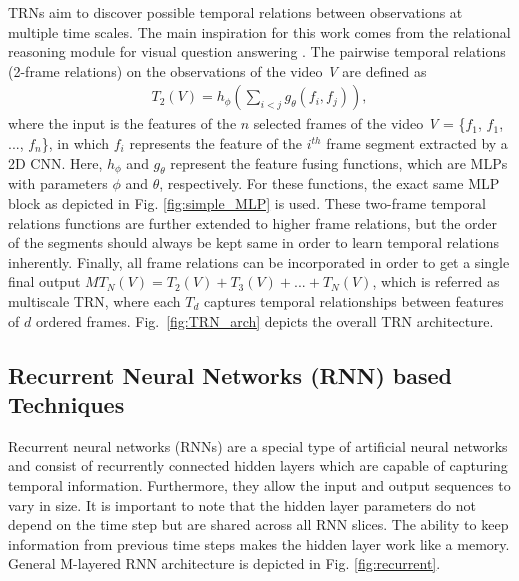 \documentclass[runningheads]{llncs}
\begin{document}
TRNs \cite{Zhou2018-ah} aim to discover possible temporal relations between observations at multiple time scales. The main inspiration for this work comes from the relational reasoning module for visual question answering \cite{santoro2017simple}. The pairwise temporal relations (2-frame relations) on the observations of the video \textit{V} are defined as
\begin{align*}
    T_2(V) = h_{\phi} \left( \sum_{i<j}{g_{\theta}(f_i, f_j)} \right),
\end{align*}
\noindent where the input is the features of the $n$ selected frames of the video \textit{V} = \{$f_1$, $f_1$, ..., $f_n$\}, in which $f_i$ represents the feature of the $i^{th}$ frame segment extracted by a 2D CNN. Here, $h_\phi$ and $g_\theta$ represent the feature fusing functions, which are MLPs with parameters $\phi$ and $\theta$, respectively. For these functions, the exact same MLP block as depicted in Fig. \ref{fig:simple_MLP} is used. These two-frame temporal relations functions are further extended to higher frame relations, but the order of the segments should always be kept same in order to learn temporal relations inherently. Finally, all frame relations can be incorporated in order to get a single final output $MT_N(V) = T_2(V) + T_3(V) + ... + T_N(V)$, which is referred as multiscale TRN, where each $T_d$ captures temporal relationships between features of $d$ ordered frames. Fig.~\ref{fig:TRN_arch} depicts the overall TRN architecture.








\subsection{Recurrent Neural Networks (RNN) based Techniques}
Recurrent neural networks (RNNs) are a special type of artificial neural networks and consist of recurrently connected hidden layers which are capable of capturing temporal information. Furthermore, they allow the input and output sequences to vary in size. It is important to note that the hidden layer parameters do not depend on the time step but are shared across all RNN slices. The ability to keep information from previous time steps makes the hidden layer work like a memory. General M-layered RNN architecture is depicted in Fig. \ref{fig:recurrent}.
\end{document}
